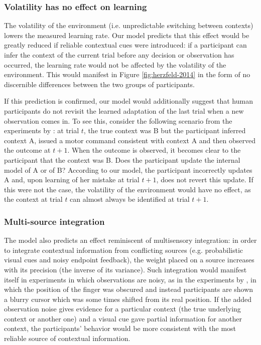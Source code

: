 \documentclass[a4paper,doc,floatsintext,natbib]{apa6}
\def \fref #1{Figure \ref{#1}}     %
\begin{document}
\subsubsection{Volatility has no effect on learning}
The volatility of the environment (i.e. unpredictable switching between contexts) lowers the measured learning rate. Our model predicts that this effect would be greatly reduced if reliable contextual cues were introduced: if a participant can infer the context of the current trial before any decision or observation has occurred, the learning rate would not be affected by the volatility of the environment. This would manifest in \fref{fig:herzfeld-2014} in the form of no discernible differences between the two groups of participants.

If this prediction is confirmed, our model would additionally suggest that human participants do not revisit the learned adaptation of the last trial when a new observation comes in. To see this, consider the following scenario from the experiments by \cite{Herzfeld_memory_2014}: at trial $t$, the true context was B but the participant inferred context A, issued a motor command consistent with context A and then observed the outcome at $t + 1$. When the outcome is observed, it becomes clear to the participant that the context was B. Does the participant update the internal model of A or of B? According to our model, the participant incorrectly updates A and, upon learning of her mistake at trial $t+1$, does not revert this update. If this were not the case, the volatility of the environment would have no effect, as the context at trial $t$ can almost always be identified at trial $t+1$.

\subsubsection{Multi-source integration}
The model also predicts an effect reminiscent of multisensory integration: in order to integrate contextual information from conflicting sources (e.g. probabilistic visual cues and noisy endpoint feedback), the weight placed on a source increases with its precision (the inverse of its variance). Such integration would manifest itself in experiments in which observations are noisy, as in the experiments by \cite{Kording_Bayesian_2004}, in which the position of the finger was obscured and instead participants are shown a blurry cursor which was some times shifted from its real position. If the added observation noise gives evidence for a particular context (the true underlying context or another one) and a visual cue gave partial information for another context, the participants' behavior would be more consistent with the most reliable source of contextual information.
\end{document}
